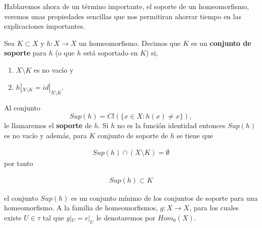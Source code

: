 Hablaremos ahora de un término importante, el soporte de un homeomorfismo, veremos unas propiedades sencillas que nos permitiran ahorrar tiempo en las explicaciones importantes. 

\begin{df}
Sea $K \subset X$ y $h:X \to X$ un homeomorfismo. Decimos que $K$ es un  \textbf{ conjunto de soporte} para $h$ (o que $h$ está soportado en $K$) si,

\begin{enumerate}
	\item $X \setminus K$ es no vacío y
	\item $h|_{X \setminus K}=id|_{X \setminus K}$.
\end{enumerate}	
 Al conjunto $$Sup(h)= Cl\left( \{x \in X : h(x)\neq x \} \right),$$  le llamaremos el \textbf{soporte} de $h$. Si $h$ no es la función identidad entonces $Sup(h)$ es no vacío y además, para $K$ conjunto de soporte de $h$ se tiene que
 
\begin{align*}
     Sup(h) \cap (X \setminus K) = \emptyset
\end{align*}
 por tanto 
 
\begin{align*}
     Sup(h) \subset K
\end{align*}

el conjunto $Sup(h)$ es un conjunto mínimo de los conjuntos de soporte para una homeomorfismo.  A la familia de homeomorfismos, $g:X \to X$, para los cuales existe $U \in \tau$ tal que $g|_U=e|_U$ le denotaremos por $Hom_0(X)$.
\end{df}
 

